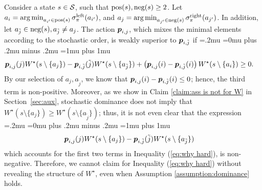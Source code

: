 Consider a state $s\in\mathcal{S}$, such that $\textnormal{pos}(s),\textnormal{neg}(s) \geq 2$. Let $a_i = \operatorname*{arg\,min}_{a_{i'}\in\textnormal{pos}(s)}\sigma^{\textnormal{left}}_\pi(a_{i'})$, and  $a_j = \operatorname*{arg\,min}_{a_{j'}\in\textnormal{neg}(s)}\sigma^{\textnormal{right}}_\pi(a_{j'})$. In addition, let $a_{\tilde j}\in \textnormal{neg}(s), a_{\tilde j} \neq a_j$. The action $\boldsymbol{ p }_{i,j}$, which mixes the minimal elements according to the stochastic order, is weakly superior to  $\boldsymbol{ p }_{i,{\tilde{j}}}$ if 
{
\thinmuskip=.2mu
\medmuskip=0mu plus .2mu minus .2mu
\thickmuskip=1mu plus 1mu
\begin{align}\label{eq:why hard}
&\boldsymbol{ p }_{i,j}(j)W^\star(s\setminus \{a_j\})-\boldsymbol{ p }_{i,{\tilde j}}({\tilde j})W^\star(s\setminus \{a_{\tilde j}\})+\left(\boldsymbol{ p }_{i,j}(i)-\boldsymbol{ p }_{i,{\tilde j}}(i)\right)W^\star(s\setminus\{a_i\}) \geq 0.
\end{align}}%
By our selection of $a_j,a_{\tilde j}$, we know that $\boldsymbol{ p }_{i,j}(i)-\boldsymbol{ p }_{i,{\tilde j}}(i) \leq 0$; hence, the third term is non-positive. Moreover, as we show in Claim \ref{claim:ass is not for W} in Section~\ref{sec:aux}, %
stochastic dominance does not imply that $W^\star(s\setminus \{a_j\}) \geq W^\star(s\setminus \{a_{\tilde j}\})$; thus, it is not even clear that the expression
{
\thinmuskip=.2mu
\medmuskip=0mu plus .2mu minus .2mu
\thickmuskip=1mu plus 1mu
\begin{align*}
&\boldsymbol{ p }_{i,j}(j)W^\star(s\setminus \{a_j\})-\boldsymbol{ p }_{i,{\tilde j}}({\tilde j})W^\star(s\setminus \{a_{\tilde j}\})
\end{align*}}%
which accounts for the first two terms in Inequality (\ref{eq:why hard}), is non-negative. Therefore, we cannot claim for Inequality  (\ref{eq:why hard}) without revealing the structure of $W^\star$, even when Assumption \ref{assumption:dominance} holds. 
 \fi
